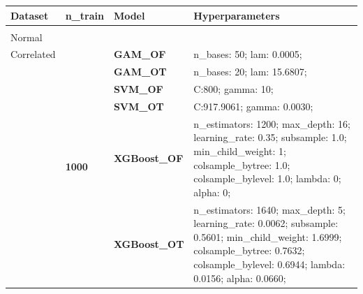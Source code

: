 \documentclass[runningheads]{llncs}
\begin{document}
\begin{table}
    \scriptsize
    \begin{tabularx}{\textwidth}{>{\RaggedRight\arraybackslash}m{1.6cm}p{1.225cm}p{2.05cm}>{\RaggedRight\arraybackslash}X}
        \toprule
        \textbf{Dataset}                        & \textbf{n\_train}                 & \textbf{Model}       & \textbf{Hyperparameters}                                                                                                                                                                          \\
        \midrule
        \multirow[t]{14}{=}{\textbf{Simple                                                                                                                                                                                                                                                                     \\Normal\\Correlated}} & \multirow[t]{7}{*}{\textbf{1000}} & \textbf{GAM\_OF} & n\_bases: 50; lam: 0.0005;  \\
        \textbf{}                               & \textbf{}                         & \textbf{GAM\_OT}     & n\_bases: 20; lam: 15.6807;                                                                                                                                                                       \\
        \textbf{}                               & \textbf{}                         & \textbf{SVM\_OF}     & C:\@800; gamma: 10;                                                                                                                                                                               \\
        \textbf{}                               & \textbf{}                         & \textbf{SVM\_OT}     & C:\@917.9061; gamma: 0.0030;                                                                                                                                                                      \\
        \textbf{}                               & \textbf{}                         & \textbf{XGBoost\_OF} & n\_estimators: 1200; max\_depth: 16; learning\_rate: 0.35; subsample: 1.0; min\_child\_weight: 1; colsample\_bytree: 1.0; colsample\_bylevel: 1.0; lambda: 0; alpha: 0;                           \\
        \textbf{}                               & \textbf{}                         & \textbf{XGBoost\_OT} & n\_estimators: 1640; max\_depth: 5; learning\_rate: 0.0062; subsample: 0.5601; min\_child\_weight: 1.6999; colsample\_bytree: 0.7632; colsample\_bylevel: 0.6944; lambda: 0.0156; alpha: 0.0660;  \\

\end{tabularx}
\end{table}
\end{document}
